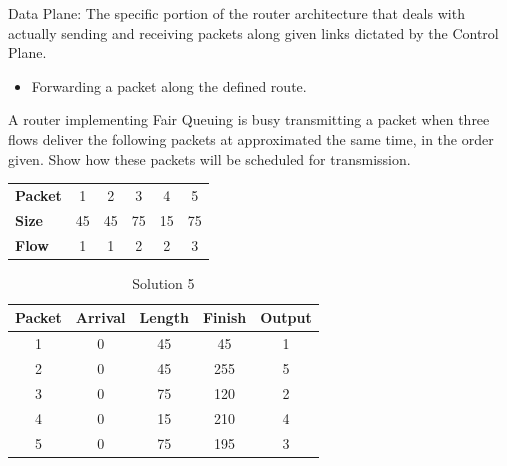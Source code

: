 \documentclass[12pt,addpoints,answers]{exam}
\begin{document}
\begin{questions}
\begin{solution}[3in]
	Data Plane: The specific portion of the router architecture that deals with actually sending and receiving packets along given links dictated by the Control Plane.
	\begin{itemize}
		\item Forwarding a packet along the defined route. 
	\end{itemize}
\end{solution}

\newpage
\question[10] A router implementing Fair Queuing is busy transmitting a packet when three flows deliver the following packets at approximated the same time, in the order given. Show how these packets will be scheduled for transmission.
\begin{center}
\begin{tabular}{lccccc}
\toprule
\textbf{Packet} &  1 &  2 &  3 &  4 &  5 \\
\textbf{Size}   & 45 & 45 & 75 & 15 & 75 \\
\textbf{Flow}   &  1 &  1 &  2 &  2 &  3 \\
\bottomrule
\end{tabular}
\end{center}
\begin{solution}[2.5in]
\begin{center}
	\begin{table}[H]
		\centering
		\caption{Solution 5}
		\label{Table 1}
		\begin{tabular}{|c|cccc}
			\hline
			Packet & \multicolumn{1}{c|}{Arrival} & \multicolumn{1}{c|}{Length} & \multicolumn{1}{c|}{Finish} & \multicolumn{1}{c|}{Output} \\ \hline
			1 & 0 & 45 & 45  & 1 \\ \cline{1-1}
			2 & 0 & 45 & 255 & 5 \\ \cline{1-1}
			3 & 0 & 75 & 120 & 2 \\ \cline{1-1}
			4 & 0 & 15 & 210 & 4 \\ \cline{1-1}
			5 & 0 & 75 & 195 & 3 \\ \cline{1-1}
		\end{tabular}
	\end{table}
\end{center}
\end{solution}


\newpage


\end{questions}
\end{document}

